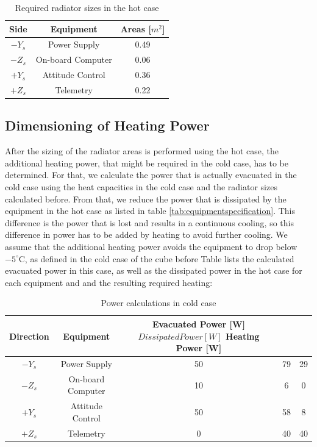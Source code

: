 \begin{table}[H]
\centering
\begin{tabular}{ | c| c| c| }
\hline 
Side & Equipment  & Areas [$m^{2}$] \\ \hline
$-Y_{s}$ & Power Supply & 0.49   \\ \hline
$-Z_{s}$ &On-board Computer & 0.06   \\\hline
$+Y_{s}$ &Attitude Control &  0.36 \\ \hline
$+Z_{s}$ &Telemetry  &    0.22 \\ \hline
\end{tabular}
\caption{Required radiator sizes in the hot case}
\label{tab:arrangement}
\end{table}

 
\subsection{Dimensioning of Heating Power}
After the sizing of the radiator areas is performed using the hot case, the additional heating power, that might be required in the cold case, has to be determined. For that, we calculate the power that is actually evacuated in the cold case using the heat capacities in the cold case and the radiator sizes calculated before. From that, we reduce the power that is dissipated by the equipment in the hot case as listed in table \ref{tab:equipmentspecification}. This difference is the power that is lost and results in a continuous cooling, so this difference in power has to be added by heating to avoid further cooling. We assume that the additional heating power avoids the equipment to drop below $-5^{\circ}$C, as defined in the cold case of the cube before Table lists the calculated evacuated power in this case, as well as the dissipated power in the hot case for each equipment and and the resulting required heating:

\begin{table}[H]
\centering
\begin{tabular}{ | c| c| c| c|c|}
\hline 
Direction& Equipment  & Evacuated Power [W] $ Dissipated Power [W] $ Heating Power [W] \\ \hline
$-Y_{s}$ & Power Supply &  50 & 79 & 29    \\ \hline
$-Z_{s}$ &On-board Computer &10 &6 &  0  \\\hline
$+Y_{s}$ &Attitude Control & 50 & 58 & 8  \\ \hline
$+Z_{s}$ &Telemetry  &  0   & 40 & 40 \\ \hline
\end{tabular}
\caption{Power calculations in cold case}
\label{tab:arrangement}
\end{table}

